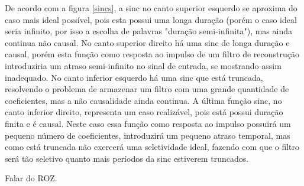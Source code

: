 De acordo com a figura \ref{sincs}, a sinc no canto superior esquerdo se aproxima do caso mais ideal possível, pois esta possui uma longa duração (porém o caso ideal seria infinito, por isso a escolha de palavras "duração semi-infinita"), mas ainda continua não causal. No canto superior direito há uma sinc de longa duração e causal, porém esta função como resposta ao impulso de um filtro de reconstrução introduziria um atraso semi-infinito no sinal de entrada, se mostrando assim inadequado. No canto inferior esquerdo há uma sinc que está truncada, resolvendo o problema de armazenar um filtro com uma grande quantidade de coeficientes, mas a não causalidade ainda continua. A última função sinc, no canto inferior direito, representa um caso realizável, pois está possui duração finita e é causal. Neste caso essa função como resposta ao impulso possuirá um pequeno número de coeficientes, introduzirá um pequeno atraso temporal, mas como está truncada não exercerá uma seletividade ideal, fazendo com que o filtro será tão seletivo quanto mais períodos da sinc estiverem truncados.

Falar do ROZ.